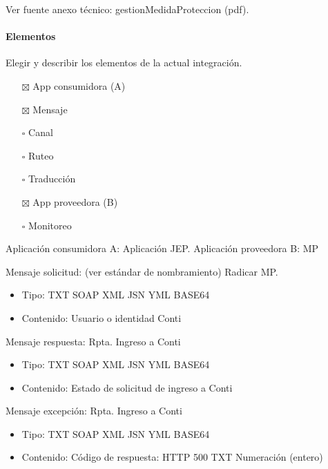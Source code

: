 \documentclass[
  paper=a4,
  ,captions=tableheading
]{scrartcl}
\providecommand{\tightlist}{%
  \setlength{\itemsep}{0pt}\setlength{\parskip}{0pt}}
\begin{document}
Ver fuente anexo técnico: gestionMedidaProteccion (pdf).

\paragraph{Elementos}\label{sec:elementos-3}

Elegir y describir los elementos de la actual integración.

\begin{itemize}
\tightlist
\item[$\boxtimes$]
  App consumidora (A)
\item[$\boxtimes$]
  Mensaje
\item[$\square$]
  Canal
\item[$\square$]
  Ruteo
\item[$\square$]
  Traducción
\item[$\boxtimes$]
  App proveedora (B)
\item[$\square$]
  Monitoreo
\end{itemize}

Aplicación consumidora A: Aplicación JEP. Aplicación proveedora B: MP

Mensaje solicitud: (ver estándar de nombramiento) Radicar MP.

\begin{itemize}
\tightlist
\item
  Tipo: TXT \textbar{} SOAP \textbar{} XML \textbar{} JSN \textbar{} YML
  \textbar{} BASE64
\item
  Contenido: Usuario o identidad Conti
\end{itemize}

Mensaje respuesta: Rpta. Ingreso a Conti

\begin{itemize}
\tightlist
\item
  Tipo: TXT \textbar{} SOAP \textbar{} XML \textbar{} JSN \textbar{} YML
  \textbar{} BASE64
\item
  Contenido: Estado de solicitud de ingreso a Conti
\end{itemize}

Mensaje excepción: Rpta. Ingreso a Conti

\begin{itemize}
\tightlist
\item
  Tipo: TXT \textbar{} SOAP \textbar{} XML \textbar{} JSN \textbar{} YML
  \textbar{} BASE64
\item
  Contenido: Código de respuesta: HTTP 500 \textbar{} TXT \textbar{}
  Numeración (entero)
\end{itemize}
\end{document}
